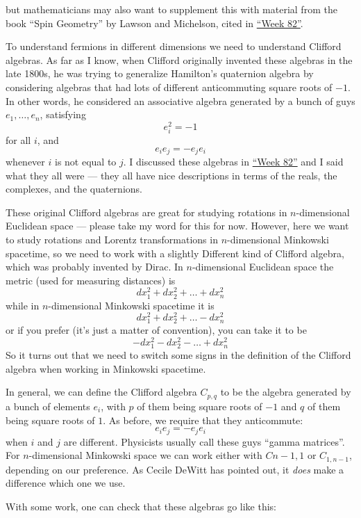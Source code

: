 \documentclass{article}
\begin{document}
but mathematicians may also want to supplement this with material from
the book ``Spin Geometry'' by Lawson and Michelson, cited in
\protect\hyperlink{week82}{``Week 82''}.

To understand fermions in different dimensions we need to understand
Clifford algebras. As far as I know, when Clifford originally invented
these algebras in the late 1800s, he was trying to generalize Hamilton's
quaternion algebra by considering algebras that had lots of different
anticommuting square roots of \(-1\). In other words, he considered an
associative algebra generated by a bunch of guys \(e_1,\ldots,e_n\),
satisfying \[e_i^2 = -1\] for all \(i\), and \[e_i e_j = - e_j e_i\]
whenever \(i\) is not equal to \(j\). I discussed these algebras in
\protect\hyperlink{week82}{``Week 82''} and I said what they all were
--- they all have nice descriptions in terms of the reals, the
complexes, and the quaternions.

These original Clifford algebras are great for studying rotations in
\(n\)-dimensional Euclidean space --- please take my word for this for
now. However, here we want to study rotations and Lorentz
transformations in \(n\)-dimensional Minkowski spacetime, so we need to
work with a slightly Different kind of Clifford algebra, which was
probably invented by Dirac. In \(n\)-dimensional Euclidean space the
metric (used for measuring distances) is
\[dx_1^2 + dx_2^2 + \ldots + dx_n^2\] while in \(n\)-dimensional
Minkowski spacetime it is \[dx_1^2 + dx_2^2 + \ldots - dx_n^2\] or if
you prefer (it's just a matter of convention), you can take it to be
\[-dx_1^2 - dx_2^2 - \ldots + dx_n^2\] So it turns out that we need to
switch some signs in the definition of the Clifford algebra when working
in Minkowski spacetime.

In general, we can define the Clifford algebra \(C_{p,q}\) to be the
algebra generated by a bunch of elements \(e_i\), with \(p\) of them
being square roots of \(-1\) and \(q\) of them being square roots of
\(1\). As before, we require that they anticommute:
\[e_i e_j = - e_j e_i\] when \(i\) and \(j\) are different. Physicists
usually call these guys ``gamma matrices''. For \(n\)-dimensional
Minkowski space we can work either with \(C{n-1,1}\) or \(C_{1,n-1}\),
depending on our preference. As Cecile DeWitt has pointed out, it
\emph{does} make a difference which one we use.

With some work, one can check that these algebras go like this:
\end{document}
